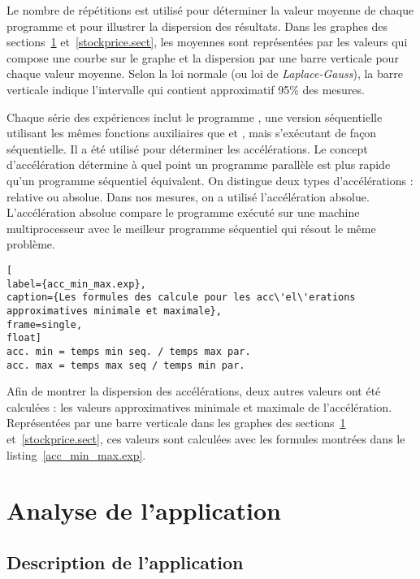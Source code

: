 Le nombre de r\'ep\'etitions est utilis\'e pour d\'eterminer la valeur moyenne de chaque programme et pour illustrer la dispersion des r\'esultats. Dans les graphes des sections~\ref{wordcount.sect} et~\ref{stockprice.sect}, les moyennes sont repr\'esent\'ees par les valeurs qui compose une courbe sur le graphe et la dispersion par une barre verticale pour chaque valeur moyenne. Selon la loi normale (ou loi de \emph{Laplace-Gauss}), la barre verticale indique l'intervalle qui contient approximatif 95\% des mesures. 

Chaque s\'erie des exp\'eriences inclut le programme , une version s\'equentielle utilisant les m\^emes fonctions
auxiliaires que  et , mais s'ex\'ecutant de fa\c con s\'equentielle. Il a \'et\'e utilis\'e pour d\'eterminer les acc\'el\'erations. Le concept d'acc\'el\'eration d\'etermine \`a quel point un programme parall\`ele est plus rapide qu'un programme s\'equentiel \'equivalent. On distingue deux types d'acc\'elérations : relative ou absolue. Dans nos mesures, on a utilis\'e l'acc\'el\'eration absolue. L'acc\'el\'eration absolue compare le programme ex\'ecut\'e sur une machine multiprocesseur avec le meilleur programme s\'equentiel qui r\'esout le m\^eme probl\`eme. 

\begin{lstlisting}[
label={acc_min_max.exp},
caption={Les formules des calcule pour les acc\'el\'erations approximatives minimale et maximale},
frame=single,
float]
acc. min = temps min seq. / temps max par.
acc. max = temps max seq / temps min par.

\end{lstlisting}

Afin de montrer la dispersion des acc\'el\'erations, deux autres valeurs ont \'et\'e calcul\'ees : les valeurs approximatives minimale et maximale de l'acc\'el\'eration. Repr\'esent\'ees par une barre verticale dans les graphes des sections~\ref{wordcount.sect} et~\ref{stockprice.sect}, ces valeurs sont calcul\'ees avec les formules montr\'ees dans le listing~\ref{acc_min_max.exp}.



\section{Analyse de l'application }
\label{wordcount.sect}



\subsection{Description de l'application }


